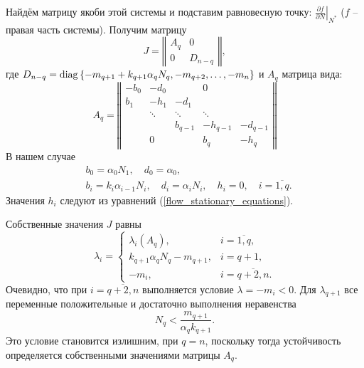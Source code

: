    Найдём матрицу якоби этой системы и подставим равновесную точку: \( \left.\frac{\partial f}{\partial N}\right|_{N^*} \) (\(f\) -- правая часть системы). Получим матрицу
    \begin{equation} \label{flow_jacobian_small}
        J = \left\Vert \begin{matrix}
            A_q & 0 \\
            0 & D_{n-q}
        \end{matrix} \right\Vert,
    \end{equation}
    где \(D_{n-q} = \operatorname{diag}\left\{ -m_{q+1} + k_{q+1} \alpha_q N_q, -m_{q+2}, \ldots, -m_{n} \right\}\) и \(A_q\) матрица вида:
    \begin{equation}
        A_q = \left\Vert \begin{matrix}
                -b_0  & -d_0   &          &     0    & \\
                b_1  & -h_1   &  -d_1    &          & \\
                        & \ddots & \ddots   &  \ddots  &          \\
                        &        & b_{q-1}  & -h_{q-1} & -d_{q-1} \\
                        &   0    &          & b_{q}    & -h_{q}  
        \end{matrix} \right\Vert
    \end{equation}
    В нашем случае 
    \begin{equation} \label{flow_jacobian_vars}
        \begin{split}
            & b_0 = \alpha_0 N_1, \quad d_0 = \alpha_0, \\
            & b_i = k_i \alpha_{i-1} N_i, \quad d_i = \alpha_i N_i, \quad h_i = 0, \quad i=\overline{1,q}.
        \end{split}
    \end{equation}
    Значения \(h_i\) следуют из уравнений (\ref{flow_stationary_equations}).


    Собственные значения \(J\) равны
    \begin{equation} \label{flow_jacobian_spectrum}
        \lambda_i = \left\{ \begin{matrix}
            \lambda_i (A_q), & i=\overline{1,q}, \\
            k_{q+1} \alpha_q N_q - m_{q+1}, & i=q+1, \\
            -m_i, & i=\overline{q+2, n}. 
        \end{matrix} \right.
    \end{equation}
    Очевидно, что при \(i = \overline{q+2,n}\) выполняется условие \(\lambda = -m_i < 0\). Для \(\lambda_{q+1}\) все переменные положительные и достаточно выполнения неравенства
    \begin{equation} \label{flow_nq_upper}
        N_q < \frac{m_{q+1}}{\alpha_q k_{q+1}}.
    \end{equation}
    Это условие становится излишним, при \(q = n\), поскольку тогда устойчивость определяется собственными значениями матрицы \(A_q\).

